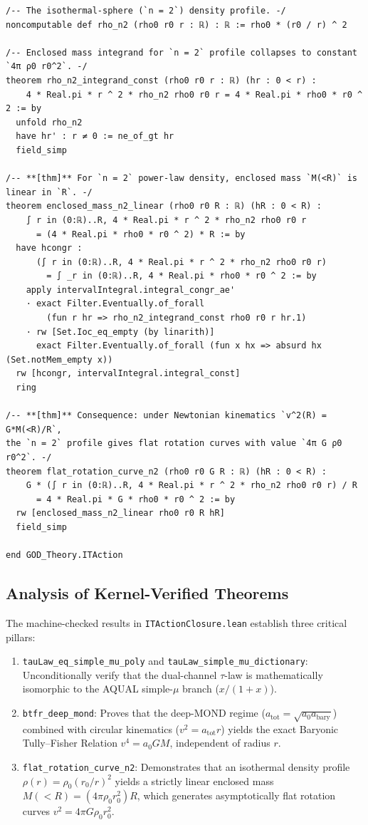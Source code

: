 \documentclass[11pt,a4paper]{article}
\theoremstyle{definition}
\begin{document}
\begin{lstlisting}[language=Lean4, caption={Machine-checked proofs in Lean 4 (\texttt{ITActionClosure.lean})}]
/-- The isothermal-sphere (`n = 2`) density profile. -/
noncomputable def rho_n2 (rho0 r0 r : ℝ) : ℝ := rho0 * (r0 / r) ^ 2

/-- Enclosed mass integrand for `n = 2` profile collapses to constant `4π ρ0 r0^2`. -/
theorem rho_n2_integrand_const (rho0 r0 r : ℝ) (hr : 0 < r) :
    4 * Real.pi * r ^ 2 * rho_n2 rho0 r0 r = 4 * Real.pi * rho0 * r0 ^ 2 := by
  unfold rho_n2
  have hr' : r ≠ 0 := ne_of_gt hr
  field_simp

/-- **[thm]** For `n = 2` power-law density, enclosed mass `M(<R)` is linear in `R`. -/
theorem enclosed_mass_n2_linear (rho0 r0 R : ℝ) (hR : 0 < R) :
    ∫ r in (0:ℝ)..R, 4 * Real.pi * r ^ 2 * rho_n2 rho0 r0 r
      = (4 * Real.pi * rho0 * r0 ^ 2) * R := by
  have hcongr :
      (∫ r in (0:ℝ)..R, 4 * Real.pi * r ^ 2 * rho_n2 rho0 r0 r)
        = ∫ _r in (0:ℝ)..R, 4 * Real.pi * rho0 * r0 ^ 2 := by
    apply intervalIntegral.integral_congr_ae'
    · exact Filter.Eventually.of_forall
        (fun r hr => rho_n2_integrand_const rho0 r0 r hr.1)
    · rw [Set.Ioc_eq_empty (by linarith)]
      exact Filter.Eventually.of_forall (fun x hx => absurd hx (Set.notMem_empty x))
  rw [hcongr, intervalIntegral.integral_const]
  ring

/-- **[thm]** Consequence: under Newtonian kinematics `v^2(R) = G*M(<R)/R`,
the `n = 2` profile gives flat rotation curves with value `4π G ρ0 r0^2`. -/
theorem flat_rotation_curve_n2 (rho0 r0 G R : ℝ) (hR : 0 < R) :
    G * (∫ r in (0:ℝ)..R, 4 * Real.pi * r ^ 2 * rho_n2 rho0 r0 r) / R
      = 4 * Real.pi * G * rho0 * r0 ^ 2 := by
  rw [enclosed_mass_n2_linear rho0 r0 R hR]
  field_simp

end GOD_Theory.ITAction
\end{lstlisting}

\subsection{Analysis of Kernel-Verified Theorems}
The machine-checked results in \texttt{ITActionClosure.lean} establish three critical pillars:
\begin{enumerate}
\item \texttt{tauLaw\_eq\_simple\_mu\_poly} and \texttt{tauLaw\_simple\_mu\_dictionary}: Unconditionally verify that the dual-channel $\tau$-law is mathematically isomorphic to the AQUAL simple-$\mu$ branch ($x/(1+x)$).
\item \texttt{btfr\_deep\_mond}: Proves that the deep-MOND regime ($a_{\text{tot}} = \sqrt{a_0 a_{\text{bary}}}$) combined with circular kinematics ($v^2 = a_{\text{tot}} r$) yields the exact Baryonic Tully--Fisher Relation $v^4 = a_0 G M$, independent of radius $r$.
\item \texttt{flat\_rotation\_curve\_n2}: Demonstrates that an isothermal density profile $\rho(r) = \rho_0 (r_0/r)^2$ yields a strictly linear enclosed mass $M(<R) = (4\pi \rho_0 r_0^2)R$, which generates asymptotically flat rotation curves $v^2 = 4\pi G \rho_0 r_0^2$.
\end{enumerate}
\end{document}
